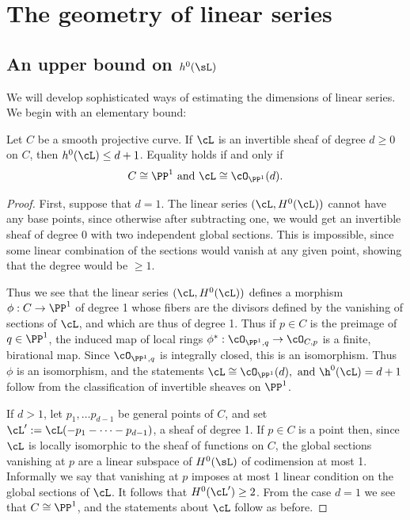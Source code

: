 \section{The geometry of linear series}

\subsection{An upper bound on $h^0(\sL)$}

We will develop sophisticated ways of estimating the dimensions of linear series. We begin with an elementary bound:

\begin{theorem}\label{characterization of P1}
Let $C$ be a smooth projective curve. If $\cL$ is an invertible sheaf of degree $d\geq 0$ on $C$, then $h^0(\cL)\leq d+1$.
Equality holds if and only if
$$
C \cong \PP^1  \text{ and  }  \cL \cong \cO_{\PP^1}(d).
$$
\end{theorem}

\begin{proof}
First, suppose that $d=1$. The linear series $(\cL, H^0(\cL))$ cannot have any base points, since
otherwise after subtracting one, we would get an invertible sheaf of degree $0$ with two independent global sections. This is impossible, since some linear combination of the sections would vanish at any given point, showing that the degree would be
$\geq 1$.

Thus we see that the linear series $(\cL, H^0(\cL))$ defines a morphism $\phi: C\to \PP^1$ of degree 1 whose fibers are the divisors defined by
the vanishing of sections of $\cL$, and which are thus of degree 1. Thus if $p\in C$ is the preimage of $q\in \PP^1$, the induced map of local rings
$\phi^*:\cO_{\PP^1, q} \to \cO_{C, p}$ is a finite, birational map. Since $\cO_{\PP^1, q}$ is integrally closed, this is an isomorphism. Thus 
$\phi$ is an isomorphism, and the statements $\cL \cong \cO_{\PP^1}(d), \hbox{ and  } \h^0(\cL) = d+1$ follow from the classification of invertible sheaves on $\PP^1$. 

If $d>1$, let $p_1,\dots p_{d-1}$ be general points of $C$, and set $\cL':=\cL(-p_1-\cdots-p_{d-1})$, a sheaf of degree 1.
 If $p\in C$ is a point then, since $\cL$ is locally isomorphic to the sheaf of functions on $C$, the global sections vanishing
 at $p$ are a linear subspace of $H^0(\sL)$ of codimension at most 1. Informally we say that vanishing at $p$ imposes at most 1 linear condition on 
the global sections of $\cL$. It follows that  $H^0(\cL') \geq 2$. From the case $d=1$ we see that $C\cong \PP^1$, and the statements
about $\cL$ follow as before.
 \end{proof}

